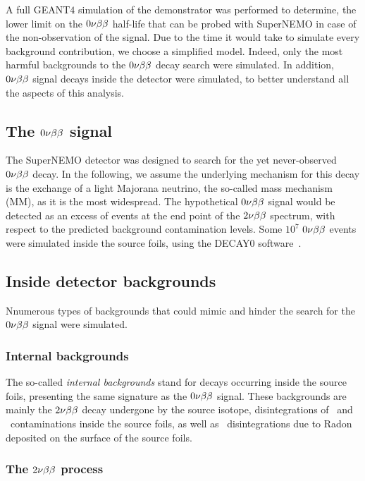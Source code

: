 A full GEANT$4$ simulation of the demonstrator was performed to determine, the lower limit on the $0\nu\beta\beta$ half-life that can be probed with SuperNEMO in case of the non-observation of the signal.
Due to the time it would take to simulate every background contribution, we choose a simplified model.
Indeed, only the most harmful backgrounds to the $0\nu\beta\beta$ decay search were simulated.
In addition, $0\nu\beta\beta$ signal decays inside the detector were simulated, to better understand all the aspects of this analysis.

\subsection{The $0\nu\beta\beta$ signal}

The SuperNEMO detector was designed to search for the yet never-observed $0\nu\beta\beta$ decay.
In the following, we assume the underlying mechanism for this decay is the exchange of a light Majorana neutrino, the so-called mass mechanism (MM), as it is the most widespread.
The hypothetical $0\nu\beta\beta$ signal would be detected as an excess of events at the end point of the $2\nu\beta\beta$ spectrum, with respect to the predicted background contamination levels.
Some $10^{7}$ $0\nu\beta\beta$ events were simulated inside the source foils, using the DECAY$0$ software~\cite{art:decay0}.

\subsection{Inside detector backgrounds}

Nnumerous types of backgrounds that could mimic and hinder the search for the $0\nu\beta\beta$ signal were simulated.

\subsubsection{Internal backgrounds}

The so-called \emph{internal backgrounds} stand for decays occurring inside the source foils, presenting the same signature as the $0\nu\beta\beta$ signal.
These backgrounds are mainly the $2\nu\beta\beta$ decay undergone by the source isotope, disintegrations of \Tl\ and \Bi\ contaminations inside the source foils, as well as \Bi\ disintegrations due to Radon deposited on the surface of the source foils.

\subsubsection*{The $2\nu\beta\beta$ process}

